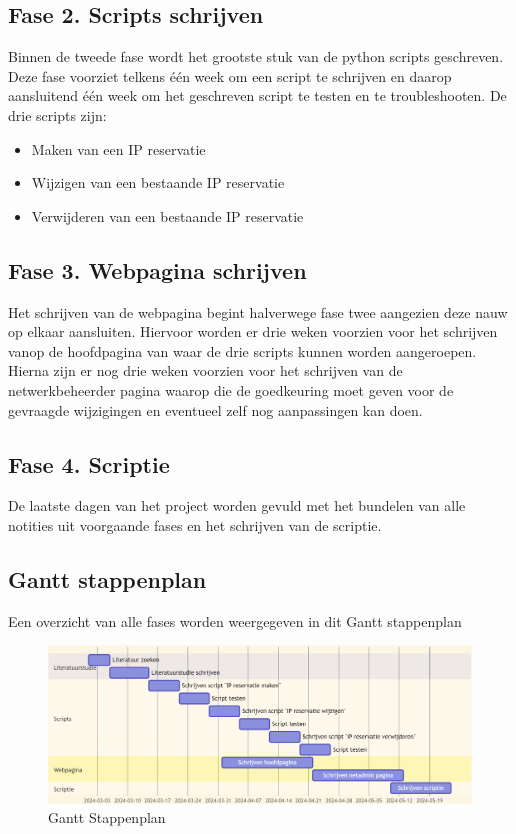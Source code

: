 \documentclass{hogent-article}
\begin{document}
\subsection{Fase 2. Scripts schrijven}
Binnen de tweede fase wordt het grootste stuk van de python scripts geschreven. Deze fase voorziet telkens één week om een script te schrijven en daarop aansluitend één week om het geschreven script te testen en te troubleshooten. De drie scripts zijn:
\begin{itemize}
    \item Maken van een IP reservatie
    \item Wijzigen van een bestaande IP reservatie
    \item Verwijderen van een bestaande IP reservatie
\end{itemize}

\subsection{Fase 3. Webpagina schrijven}
Het schrijven van de webpagina begint halverwege fase twee aangezien deze nauw op elkaar aansluiten.
Hiervoor worden er drie weken voorzien voor het schrijven vanop de hoofdpagina van waar de drie scripts kunnen worden aangeroepen. Hierna zijn er nog drie weken voorzien voor het schrijven van de netwerkbeheerder pagina waarop die de goedkeuring moet geven voor de gevraagde wijzigingen en eventueel zelf nog aanpassingen kan doen.

\subsection{Fase 4. Scriptie}
De laatste dagen van het project worden gevuld met het bundelen van alle notities uit voorgaande fases en het schrijven van de scriptie.

\subsection{Gantt stappenplan}
Een overzicht van alle fases worden weergegeven in dit Gantt stappenplan
\begin{figure}[h!]
    \includegraphics[scale=0.28]{Gantt}
    \caption{Gantt Stappenplan}
    \label{Gantt Stappenplan}
\end{figure}
\end{document}
